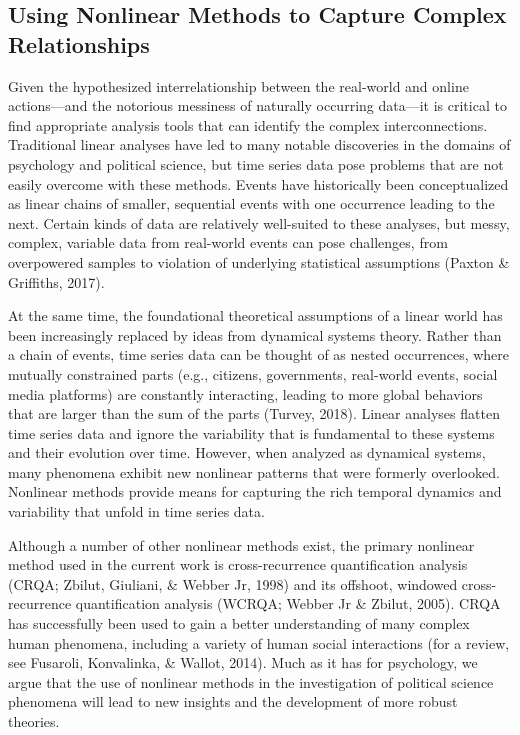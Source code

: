\documentclass[english,man]{apa6}
\begin{document}
\hypertarget{using-nonlinear-methods-to-capture-complex-relationships}{%
\subsection{Using Nonlinear Methods to Capture Complex Relationships}\label{using-nonlinear-methods-to-capture-complex-relationships}}

Given the hypothesized interrelationship between the real-world and online
actions---and the notorious messiness of naturally occurring data---it is
critical to find appropriate analysis tools that can identify the complex
interconnections. Traditional linear analyses have led to many notable
discoveries in the domains of psychology and political science, but time series
data pose problems that are not easily overcome with these methods. Events have
historically been conceptualized as linear chains of smaller, sequential events
with one occurrence leading to the next. Certain kinds of data are relatively
well-suited to these analyses, but messy, complex, variable data from real-world
events can pose challenges, from overpowered samples to violation of underlying
statistical assumptions (Paxton \& Griffiths, 2017).

At the same time, the foundational theoretical assumptions of a linear world has
been increasingly replaced by ideas from dynamical systems theory. Rather than a
chain of events, time series data can be thought of as nested occurrences, where
mutually constrained parts (e.g., citizens, governments, real-world events,
social media platforms) are constantly interacting, leading to more global
behaviors that are larger than the sum of the parts (Turvey, 2018).
Linear analyses flatten time series data and ignore the variability that is
fundamental to these systems and their evolution over time. However, when
analyzed as dynamical systems, many phenomena exhibit new nonlinear patterns
that were formerly overlooked. Nonlinear methods provide means for capturing the
rich temporal dynamics and variability that unfold in time series data.

Although a number of other nonlinear methods exist, the primary nonlinear method
used in the current work is cross-recurrence quantification analysis (CRQA; Zbilut, Giuliani, \& Webber Jr, 1998) and its offshoot, windowed cross-recurrence quantification
analysis (WCRQA; Webber Jr \& Zbilut, 2005). CRQA has successfully been used to gain
a better understanding of many complex human phenomena, including a variety of
human social interactions (for a review, see Fusaroli, Konvalinka, \& Wallot, 2014). Much as it
has for psychology, we argue that the use of nonlinear methods in the
investigation of political science phenomena will lead to new insights and the
development of more robust theories.
\end{document}
